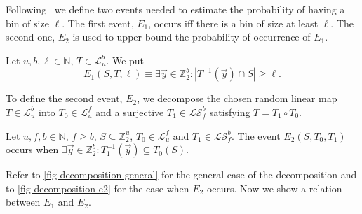 ﻿\documentclass[review]{elsarticle}
\newcommand{\vecspace}[2]{\mathbb{Z}_{#1}^{#2}}
\newcommand{\binvecspace}[1]{\vecspace{2}{#1}}
\newcommand{\linearmaps}[2]{\mathcal{L}_{#1}^{#2}}
\newcommand{\surjectivelinearmaps}[2]{\mathcal{LS}_{#1}^{#2}}
\begin{document}
Following~\cite{alonetal} we define two events needed to estimate the probability of having a  bin of size $\ell$. 
The first event, $E_1$, occurs iff there is a bin of size at least $\ell$.
The second one, $E_2$ is used to upper bound the probability of occurrence of $E_1$.
\begin{definition}
Let $u, b, \ell \in \mathbb{N}$, $T \in \linearmaps{u}{b}$. We put \[E_1(S, T, \ell) \equiv \exists \vec{y} \in \binvecspace{b} \colon |T^{-1}(\vec y) \cap S| \geq \ell.\]
\end{definition}

To define the second event, $E_2$, we decompose the chosen random linear map $T \in \linearmaps{u}{b}$ into $T_0 \in \linearmaps{u}{f}$ and a surjective $T_1 \in \surjectivelinearmaps{f}{b}$ satisfying $T = T_1 \circ T_0$.

\begin{definition}
Let $u, f, b \in \mathbb{N}$, $f \geq b$, $S \subseteq \binvecspace{u}$, $T_0 \in \linearmaps{u}{f}$ and $T_1 \in \surjectivelinearmaps{f}{b}$.
The event $E_2(S, T_0, T_1)$ occurs when $\exists \vec{y} \in \binvecspace{b} \colon T_1^{-1}(\vec y) \subseteq T_0(S)$.
\end{definition}

Refer to \cref{fig-decomposition-general} for the general case of the decomposition and to \cref{fig-decomposition-e2} for the case when $E_2$ occurs. 
Now we show a relation between $E_1$ and $E_2$.
\end{document}

